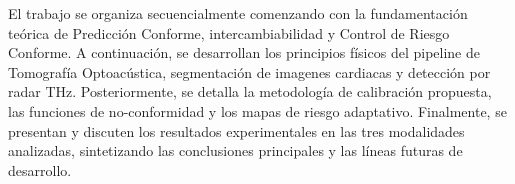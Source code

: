El trabajo se organiza secuencialmente comenzando con la fundamentación teórica de Predicción Conforme, intercambiabilidad y Control de Riesgo Conforme. 
A continuación, se desarrollan los principios físicos del pipeline de Tomografía Optoacústica, segmentación de imagenes cardiacas y detección por radar THz. Posteriormente, se detalla la metodología de calibración propuesta, las funciones de no-conformidad y los mapas de riesgo adaptativo. Finalmente, se presentan y discuten los resultados experimentales en las tres modalidades analizadas, sintetizando las conclusiones principales y las líneas futuras de desarrollo.




%  
%  
%  
%  
%  
